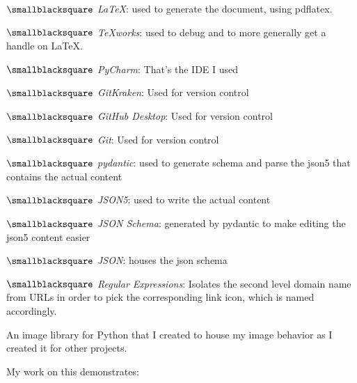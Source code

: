 \documentclass[10mm,letterpaper,notitlepage]{article}
\begin{document}
{{								$\smallblacksquare$ \textit{LaTeX}: used to generate the document, using pdflatex.
								
								$\smallblacksquare$ \textit{TeXworks}: used to debug and to more generally get a handle on LaTeX.
								
								$\smallblacksquare$ \textit{PyCharm}: That's the IDE I used
								
								$\smallblacksquare$ \textit{GitKraken}: Used for version control
								
								$\smallblacksquare$ \textit{GitHub Desktop}: Used for version control
								
								$\smallblacksquare$ \textit{Git}: Used for version control
								
								$\smallblacksquare$ \textit{pydantic}: used to generate schema and parse the json5 that contains the actual content
								
								$\smallblacksquare$ \textit{JSON5}: used to write the actual content
								
								$\smallblacksquare$ \textit{JSON Schema}: generated by pydantic to make editing the json5 content easier
								
								$\smallblacksquare$ \textit{JSON}: houses the json schema
								
								$\smallblacksquare$ \textit{Regular Expressions}: Isolates the second level domain name from URLs in order to pick the corresponding link icon, which is named accordingly.
								
								\setlength{\parindent}{\parindent-4mm}
							\par}
							{\color[RGB]{0, 0, 0}
							\fontsize{2.25mm}{3.0mm}\selectfont
									{\color[RGB]{108, 29, 169}
									\fontsize{4.5mm}{6.0mm}\selectfont
									\par}
							An image library for Python that I created to house my image behavior as I created it for other projects.
							
							My work on this demonstrates:
								\setlength{\parindent}{\parindent+4mm}
								
}}
\end{document}
